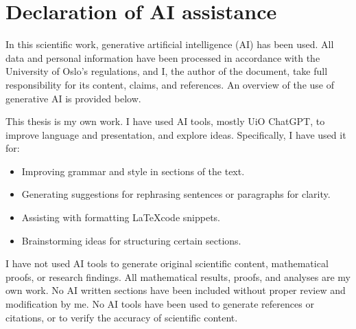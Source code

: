 \section*{Declaration of AI assistance}

In this scientific work, generative artificial intelligence (AI) has been used. All data and personal information have been processed in accordance with the University of Oslo's
regulations, and I, the author of the document, take full responsibility for its content,
claims, and references. An overview of the use of generative AI is provided below.

This thesis is my own work. I have used AI tools, mostly UiO ChatGPT, to
improve language and presentation, and explore ideas. Specifically, I have used it for:
\begin{itemize}
    \item Improving grammar and style in sections of the text.
    \item Generating suggestions for rephrasing sentences or paragraphs for clarity.
    \item Assisting with formatting \LaTeX code snippets.
    \item Brainstorming ideas for structuring certain sections.
\end{itemize}
I have not used AI tools to generate original scientific content, mathematical proofs,
or research findings. All mathematical results, proofs, and analyses are my own work. No AI written sections have been included without proper review and modification by me. No AI tools have been used to generate references or citations, or to verify the accuracy of scientific content.